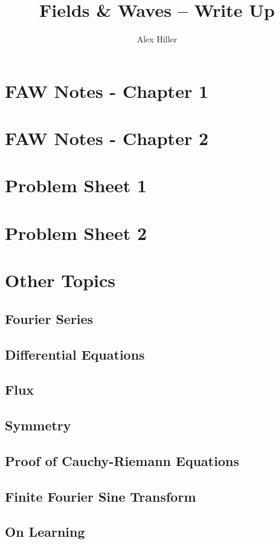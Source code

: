 \documentclass{article}
\author{Alex Hiller}
\title{Fields \& Waves -- Write Up}
\begin{document}
\maketitle 
\tableofcontents
\clearpage

\section{FAW Notes - Chapter 1} 

\section{FAW Notes - Chapter 2} 

\section{Problem Sheet 1} 

\section{Problem Sheet 2} 

\section{Other Topics} 

\subsection{Fourier Series}
\subsection{Differential Equations} 
\subsection{Flux} 
\subsection{Symmetry} 
\subsection{Proof of Cauchy-Riemann Equations} 
\subsection{Finite Fourier Sine Transform} 
\subsection{On Learning} 
\end{document}
